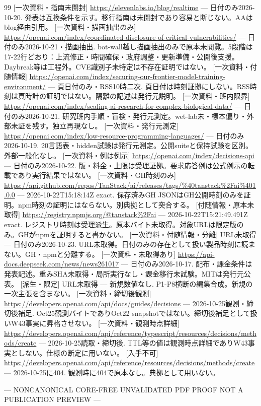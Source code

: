 \documentclass[lualatex,a4paper,10pt]{jlreq}
\begin{document}
{\begin{thebibliography}{99}
 [一次資料・指南未開封] \url{https://elevenlabs.io/blog/realtime} --- 日付のみ2026-10-20. 発表は互換条件を示す。移行指南は未開封であり容易と断じない。AAはblog経由引用。
 [一次資料・描画抽出のみ] \url{https://openai.com/index/coordinated-disclosure-of-critical-vulnerabilities/} --- 日付のみ2026-10-21・描画抽出. bot-wall越し描画抽出のみで原本未閲覧。5段階は17-22行どおり：上流修正・時間確保・政府調整・更新準備・公開後支援。Daybreak等は工程外。CVE識別子未特定は不存在証明ではない。
 [一次資料・付随情報] \url{https://openai.com/index/securing-our-frontier-model-training-environment/} --- 頁日付のみ・RSS10時二次. 頁日付は時刻証拠にしない。RSS時刻は頁時計の証明ではない。隔離の記述は発行元説明。
 [一次資料・班内限界] \url{https://openai.com/index/scaling-ai-research-for-complex-biological-data/} --- 日付のみ2026-10-21. 研究班内手順・盲検・発行元測定。wet-lab未・標本偏り・外部未証を残す。独立再現なし。
 [一次資料・発行元測定] \url{https://openai.com/index/low-resource-programming-languages/} --- 日付のみ2026-10-19. 20言語表・hidden試験は発行元測定。公開suiteと保持試験を区別。外部一般化なし。
 [一次資料・例は例示] \url{https://openai.com/index/decisions-api} --- 日付のみ2026-10-22. 版・料金・上限は受理証拠。要求応答例は公式例示の転載であり実行結果ではない。
 [一次資料・GH時刻のみ] \url{https://api.github.com/repos/TanStack/ai/releases/tags/%40tanstack%2Fai%401.0.0} --- 2026-10-22T15:18:14Z exact. 保存済みGH JSONはGH公開時刻のみを証明。npm時刻の証明にはならない。別典拠として突合する。
 [付随情報・原本未取得] \url{https://registry.npmjs.org/@tanstack%2Fai} --- 2026-10-22T15:21:49.491Z exact. レジストリ時刻は受理派生。原本バイト未取得。対象URLは限定版のみ。GHがnpmを証明すると書かない。
 [一次資料・付随情報・分離] URL未取得 --- 日付のみ2026-10-23. URL未取得。日付のみの存在として扱い製品時刻に読まない。GH・npmと分離する。
 [一次資料・未取得あり] \url{https://api-docs.deepseek.com/news/news261017} --- 日付のみ2026-10-17. 配布・課金条件は発表記述。重みSHA未取得・局所実行なし・課金移行未試験。MITは発行元公表。
 [派生・限定] URL未取得 --- 新規数値なし. P1-P8横断の編集合成。新規の一次主張を含まない。
 [一次資料・締切後観測] \url{https://developers.openai.com/api/docs/guides/decisions} --- 2026-10-25観測・締切後補足. Oct25観測バイトでありOct22 snapshotではない。締切後補足として扱いW43事実に昇格させない。
 [一次資料・観測時点詳細] \url{https://developers.openai.com/api/reference/typescript/resources/decisions/methods/create} --- 2026-10-25読取・締切後. TTL等の値は観測時点詳細でありW43事実としない。仕様の断定に用いない。
 [入手不可] \url{https://developers.openai.com/api/reference/resources/decisions/methods/create} --- 2026-10-25に404. 観測時に404で原本なし。典拠として用いない。
\end{thebibliography}}

\begin{center}\color{SurveyMuted}--- NONCANONICAL CORE-FREE UNVALIDATED PDF PROOF \quad NOT A PUBLICATION PREVIEW ---\end{center}
\end{document}
